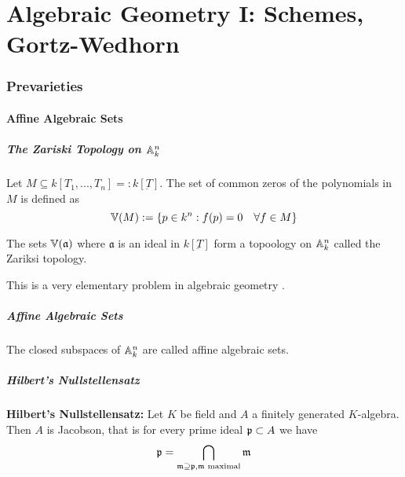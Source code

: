 \part{Algebraic Geometry I: Schemes, Gortz-Wedhorn} 

\section{Prevarieties}

\subsection{Affine Algebraic Sets}

\subsubsection{The Zariski Topology on $\mathbb{A}_k^n$}

\begin{definition}
    Let $M\subseteq k[T_1,...,T_n] =: k[\underbar{T}]$. The set of common zeros of the polynomials in $M$ is defined as
    \[\mathbb{V}(M) := \{p\in k^n : f(p) = 0 \quad \forall f \in M\}\]
\end{definition}

\begin{proposition}
    The sets $\mathbb{V}(\mathfrak{a})$ where $\mathfrak{a}$ is an ideal in $k[\underbar{T}]$ form a topoology on $\mathbb{A}^n_k$ called the Zariksi topology.
\end{proposition}

This is a very elementary problem in algebraic geometry . 

\subsubsection{Affine Algebraic Sets}

\begin{definition}
    The closed subspaces of $\mathbb{A}^n_k$ are called affine algebraic sets. 
\end{definition}

\subsubsection{Hilbert's Nullstellensatz}

\begin{theorem}
    \textbf{Hilbert's Nullstellensatz: }Let $K$ be  field and $A$ a finitely generated $K$-algebra. Then $A$ is Jacobson, that is for every prime ideal $\mathfrak{p}\subset A$ we have 
    \[\mathfrak{p} = \bigcap_{\mathfrak{m} \supseteq \mathfrak{p}, \mathfrak{m} \text{ maximal}} \mathfrak{m}\] 
\end{theorem}

